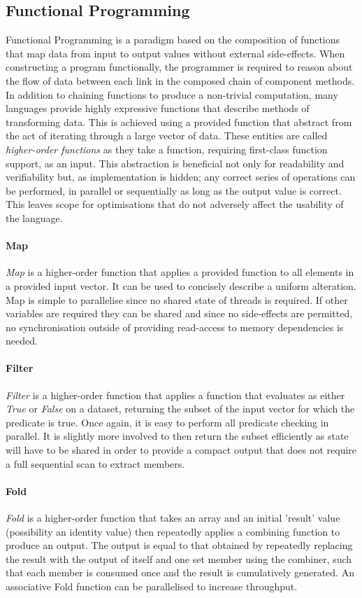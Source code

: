 \subsection{Functional Programming}
Functional Programming is a paradigm based on the composition of functions that map data from input to output values without external side-effects. When constructing a program functionally, the programmer is required to reason about the flow of data between each link in the composed chain of component methods.
In addition to chaining functions to produce a non-trivial computation, many languages provide highly expressive functions \cite{ghc} that describe methods of transforming data. This is achieved using a provided function that abstract from the act of iterating through a large vector of data.
These entities are called \emph{higher-order functions} as they take a function, requiring first-class function support, as an input.
This abstraction is beneficial not only for readability and verifiability but, as implementation is hidden; any correct series of operations can be performed, in parallel or sequentially as long as the output value is correct. This leaves scope for optimisations that do not adversely affect the usability of the language.
\paragraph{Map}
\emph{Map} is a higher-order function that applies a provided function to all elements in a provided input vector. It can be used to concisely describe a uniform alteration.
Map is simple to parallelise since no shared state of threads is required.
If other variables are required they can be shared and since no side-effects are permitted, no synchronisation outside of providing read-access to memory dependencies is needed.
\paragraph{Filter}
\emph{Filter} is a higher-order function that applies a function that evaluates as either \emph{True} or \emph{False} on a dataset, returning the subset of the input vector for which the predicate is true. Once again, it is easy to perform all predicate checking in parallel. It is slightly more involved to then return the subset efficiently as state will have to be shared in order to provide a compact output that does not require a full sequential scan to extract members.
\paragraph{Fold}
\emph{Fold} is a higher-order function that takes an array and an initial 'result' value (possibility an identity value) then repeatedly applies a combining function to produce an output. The output is equal to that obtained by repeatedly replacing the result with the output of itself and one set member using the combiner, such that each member is consumed once and the result is cumulatively generated. An associative Fold function can be parallelised to increase throughput.
